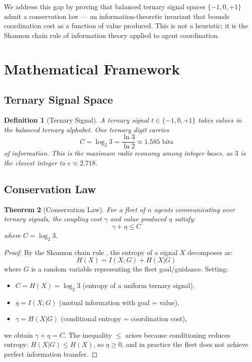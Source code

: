 \documentclass[11pt,a4paper]{article}
\newtheorem{theorem}{Theorem}
\newtheorem{definition}[theorem]{Definition}
\newcommand{\trit}{\{-1,0,+1\}}
\newcommand{\C}{C}
\newcommand{\gammaCoord}{\gamma}
\newcommand{\etaVal}{\eta}
\begin{document}
We address this gap by proving that balanced ternary signal spaces $\trit$ admit a conservation law --- an information-theoretic invariant that bounds coordination cost as a function of value produced. This is not a heuristic; it is the Shannon chain rule of information theory \cite{shannon1948} applied to agent coordination.

\section{Mathematical Framework}

\subsection{Ternary Signal Space}

\begin{definition}[Ternary Signal]
A ternary signal $t \in \trit$ takes values in the balanced ternary alphabet. One ternary digit carries
\begin{equation}
\C = \log_2 3 = \frac{\ln 3}{\ln 2} \approx 1.585 \text{ bits}
\end{equation}
of information. This is the maximum radix economy among integer bases, as $3$ is the closest integer to $e \approx 2.718$.
\end{definition}

\subsection{Conservation Law}

\begin{theorem}[Conservation Law]
\label{thm:conservation}
For a fleet of $n$ agents communicating over ternary signals, the coupling cost $\gammaCoord$ and value produced $\etaVal$ satisfy:
\begin{equation}
\gammaCoord + \etaVal \leq \C
\end{equation}
where $\C = \log_2 3$.
\end{theorem}

\begin{proof}
By the Shannon chain rule \cite{cover2006}, the entropy of a signal $X$ decomposes as:
\begin{equation}
H(X) = I(X; G) + H(X | G)
\end{equation}
where $G$ is a random variable representing the fleet goal/guidance. Setting:
\begin{itemize}
\item $\C = H(X) = \log_2 3$ (entropy of a uniform ternary signal),
\item $\etaVal = I(X; G)$ (mutual information with goal = value),
\item $\gammaCoord = H(X | G)$ (conditional entropy = coordination cost),
\end{itemize}
we obtain $\gammaCoord + \etaVal = \C$. The inequality $\leq$ arises because conditioning reduces entropy: $H(X|G) \leq H(X)$, so $\etaVal \geq 0$, and in practice the fleet does not achieve perfect information transfer.
\end{proof}
\end{document}
